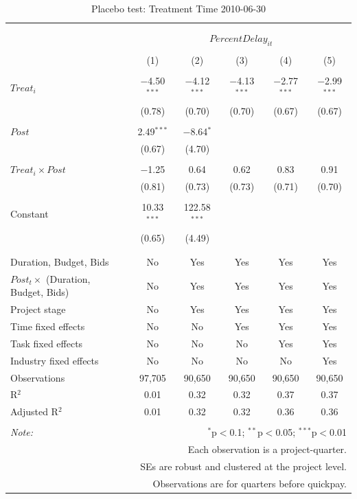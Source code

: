 \documentclass[
]{article}
\begin{document}
\begin{table}[H] \centering 
  \caption{Placebo test: Treatment Time 2010-06-30} 
  \label{} 
\small 
\begin{tabular}{@{\extracolsep{-2pt}}lccccc} 
\\[-1.8ex]\hline 
\hline \\[-1.8ex] 
\\[-1.8ex] & \multicolumn{5}{c}{$PercentDelay_{it}$} \\ 
\\[-1.8ex] & (1) & (2) & (3) & (4) & (5)\\ 
\hline \\[-1.8ex] 
 $Treat_i$ & $-$4.50$^{***}$ & $-$4.12$^{***}$ & $-$4.13$^{***}$ & $-$2.77$^{***}$ & $-$2.99$^{***}$ \\ 
  & (0.78) & (0.70) & (0.70) & (0.67) & (0.67) \\ 
  & & & & & \\ 
 $Post$ & 2.49$^{***}$ & $-$8.64$^{*}$ &  &  &  \\ 
  & (0.67) & (4.70) &  &  &  \\ 
  & & & & & \\ 
 $Treat_i \times Post$ & $-$1.25 & 0.64 & 0.62 & 0.83 & 0.91 \\ 
  & (0.81) & (0.73) & (0.73) & (0.71) & (0.70) \\ 
  & & & & & \\ 
 Constant & 10.33$^{***}$ & 122.58$^{***}$ &  &  &  \\ 
  & (0.65) & (4.49) &  &  &  \\ 
  & & & & & \\ 
\hline \\[-1.8ex] 
Duration, Budget, Bids & No & Yes & Yes & Yes & Yes \\ 
$Post_t \times$  (Duration, Budget, Bids) & No & Yes & Yes & Yes & Yes \\ 
Project stage & No & Yes & Yes & Yes & Yes \\ 
Time fixed effects & No & No & Yes & Yes & Yes \\ 
Task fixed effects & No & No & No & Yes & Yes \\ 
Industry fixed effects & No & No & No & No & Yes \\ 
Observations & 97,705 & 90,650 & 90,650 & 90,650 & 90,650 \\ 
R$^{2}$ & 0.01 & 0.32 & 0.32 & 0.37 & 0.37 \\ 
Adjusted R$^{2}$ & 0.01 & 0.32 & 0.32 & 0.36 & 0.36 \\ 
\hline 
\hline \\[-1.8ex] 
\textit{Note:}  & \multicolumn{5}{r}{$^{*}$p$<$0.1; $^{**}$p$<$0.05; $^{***}$p$<$0.01} \\ 
 & \multicolumn{5}{r}{Each observation is a project-quarter.} \\ 
 & \multicolumn{5}{r}{SEs are robust and clustered at the project level.} \\ 
 & \multicolumn{5}{r}{Observations are for quarters before quickpay.} \\ 
\end{tabular} 
\end{table}
\end{document}
